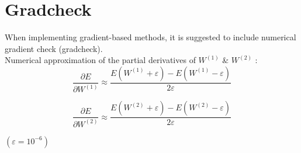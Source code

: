 \documentclass[11pt]{article}
\begin{document}
\newpage

\section{Gradcheck}

When implementing gradient-based methods, it is suggested to include numerical gradient check (gradcheck). \\

\noindent Numerical approximation of the partial derivatives of $W^{(1)}$ \& $W^{(2)}$ : \\


\begin{equation} \frac{\partial E}{\partial W^{(1)}} \approx \frac{E{(W^{(1)} + \varepsilon)} - E{(W^{(1)} - \varepsilon)}}{2\varepsilon} \end{equation}

\begin{equation} \frac{\partial E}{\partial W^{(2)}} \approx \frac{E{(W^{(2)} + \varepsilon)} - E{(W^{(2)} - \varepsilon)}}{2\varepsilon} \end{equation}

${( \varepsilon = 10^{-6})} $
\end{document}
